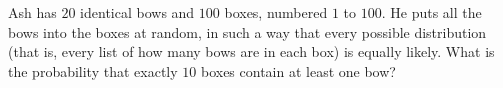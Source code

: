 Ash has $20$ identical bows and $100$ boxes, numbered $1$ to $100$. He puts all the bows into the boxes at random, in such a way that every possible distribution (that is, every list of how many bows are in each box) is equally likely. What is the probability that exactly $10$ boxes contain at least one bow?
